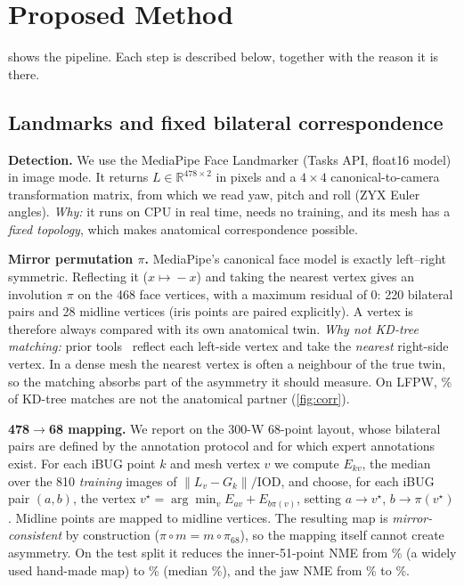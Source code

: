 \section{Proposed Method}
\label{sec:method}



 shows the pipeline. Each step is described below, together with the
reason it is there.

\subsection{Landmarks and fixed bilateral correspondence}
\label{sec:corr}
\textbf{Detection.} We use the MediaPipe Face Landmarker (Tasks API, float16 model) in
image mode. It returns $L\in\mathbb{R}^{478\times2}$ in pixels and a $4{\times}4$
canonical-to-camera transformation matrix, from which we read yaw, pitch and roll (ZYX
Euler angles). \emph{Why:} it runs on CPU in real time, needs no training, and its mesh has
a \emph{fixed topology}, which makes anatomical correspondence possible.

\textbf{Mirror permutation $\pi$.} MediaPipe's canonical face model is exactly
left--right symmetric. Reflecting it ($x\!\mapsto\!-x$) and taking the nearest vertex
gives an involution $\pi$ on the 468 face vertices, with a maximum residual of $0$:
220 bilateral pairs and 28 midline vertices (iris points are paired explicitly). A
vertex is therefore always compared with its own anatomical twin.
\emph{Why not KD-tree matching:} prior tools~\cite{nashokan_facialasymmetry,
varghaei2025aesthetic} reflect each left-side vertex and take the \emph{nearest} right-side
vertex. In a dense mesh the nearest vertex is often a neighbour of the true twin, so the
matching absorbs part of the asymmetry it should measure. On LFPW, \kdWrong\% of KD-tree
matches are not the anatomical partner (\cref{fig:corr}).

\textbf{478$\to$68 mapping.} We report on the 300-W 68-point layout, whose bilateral pairs
are defined by the annotation protocol and for which expert annotations exist. For each
iBUG point $k$ and mesh vertex $v$ we compute $E_{kv}$, the median over the 810
\emph{training} images of $\|L_v-G_k\|/\mathrm{IOD}$, and choose, for each iBUG pair
$(a,b)$, the vertex $v^\star=\arg\min_v E_{av}+E_{b\pi(v)}$, setting $a\!\to\!v^\star$,
$b\!\to\!\pi(v^\star)$. Midline points are mapped to midline vertices. The resulting map
is \emph{mirror-consistent} by construction ($\pi\circ m = m\circ\pi_{68}$), so the
mapping itself cannot create asymmetry. On the test split it reduces the inner-51-point
NME from \nmeHandInner\% (a widely used hand-made map) to \nmeFitInner\% (median
\nmeFitInnerMed\%), and the jaw NME from \nmeHandJaw\% to \nmeFitJaw\%.

